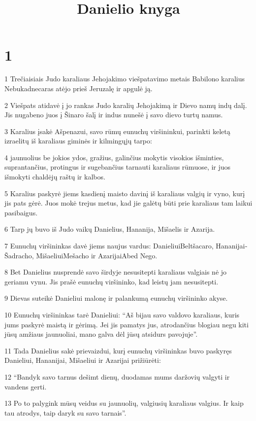 

\title{Danielio knyga}

\chapter{1}


\par 1 Trečiaisiais Judo karaliaus Jehojakimo viešpatavimo metais Babilono karalius Nebukadnecaras atėjo prieš Jeruzalę ir apgulė ją. 
\par 2 Viešpats atidavė į jo rankas Judo karalių Jehojakimą ir Dievo namų indų dalį. Jis nugabeno juos į Šinaro šalį ir indus nunešė į savo dievo turtų namus. 
\par 3 Karalius įsakė Ašpenazui, savo rūmų eunuchų viršininkui, parinkti keletą izraelitų iš karaliaus giminės ir kilmingųjų tarpo: 
\par 4 jaunuolius be jokios ydos, gražius, galinčius mokytis visokios išminties, suprantančius, protingus ir sugebančius tarnauti karaliaus rūmuose, ir juos išmokyti chaldėjų raštų ir kalbos. 
\par 5 Karalius paskyrė jiems kasdienį maisto davinį iš karaliaus valgių ir vyno, kurį jis pats gėrė. Juos mokė trejus metus, kad jie galėtų būti prie karaliaus tam laikui pasibaigus. 
\par 6 Tarp jų buvo iš Judo vaikų Danielius, Hananija, Mišaelis ir Azarija. 
\par 7 Eunuchų viršininkas davė jiems naujus vardus: Danieliui­Beltšacaro, Hananijai­Šadracho, Mišaeliui­Mešacho ir Azarijai­Abed Nego. 
\par 8 Bet Danielius nusprendė savo širdyje nesusitepti karaliaus valgiais nė jo geriamu vynu. Jis prašė eunuchų viršininko, kad leistų jam nesusitepti. 
\par 9 Dievas suteikė Danieliui malonę ir palankumą eunuchų viršininko akyse. 
\par 10 Eunuchų viršininkas tarė Danieliui: “Aš bijau savo valdovo karaliaus, kuris jums paskyrė maistą ir gėrimą. Jei jis pamatys jus, atrodančius blogiau negu kiti jūsų amžiaus jaunuoliai, mano galva dėl jūsų atsidurs pavojuje”. 
\par 11 Tada Danielius sakė prievaizdui, kurį eunuchų viršininkas buvo paskyręs Danieliui, Hananijai, Mišaeliui ir Azarijai prižiūrėti: 
\par 12 “Bandyk savo tarnus dešimt dienų, duodamas mums daržovių valgyti ir vandens gerti. 
\par 13 Po to palygink mūsų veidus su jaunuolių, valgiusių karaliaus valgius. Ir kaip tau atrodys, taip daryk su savo tarnais”. 
